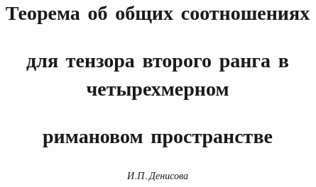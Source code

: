 




%





\newcommand{\tts}[1]{}









\setcounter{page}{75}















\author{\it И.П.\,Денисова}




\title{Теорема об общих соотношениях


для тензора второго ранга в четырехмерном


римановом пространстве}





\date{}




\pagestyle{plain} %







\maketitle


\label{begin}





